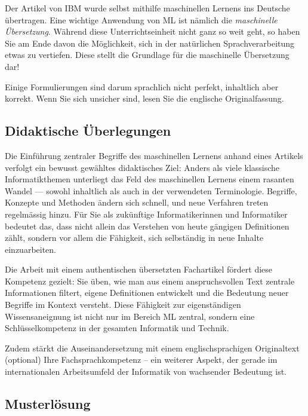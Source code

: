 \begin{lpu}
\begin{hinweis}
    Der Artikel von IBM wurde selbst mithilfe maschinellen Lernens ins Deutsche übertragen. Eine wichtige Anwendung von ML ist nämlich die \textit{maschinelle Übersetzung}. Während diese Unterrichtseinheit nicht ganz so weit geht, so haben Sie am Ende davon die Möglichkeit, sich in der natürlichen Sprachverarbeitung etwas zu vertiefen. Diese stellt die Grundlage für die maschinelle Übersetzung dar! 
    
    Einige Formulierungen sind darum sprachlich nicht perfekt, inhaltlich aber korrekt. Wenn Sie sich unsicher sind, lesen Sie die englische Originalfassung.
\end{hinweis}
\end{lpu}

\subsection*{Didaktische Überlegungen}
Die Einführung zentraler Begriffe des maschinellen Lernens anhand eines Artikels verfolgt ein bewusst gewähltes didaktisches Ziel: Anders als viele klassische Informatikthemen unterliegt das Feld des maschinellen Lernens einem rasanten Wandel — sowohl inhaltlich als auch in der verwendeten Terminologie. Begriffe, Konzepte und Methoden ändern sich schnell, und neue Verfahren treten regelmässig hinzu. Für Sie als zukünftige Informatikerinnen und Informatiker bedeutet das, dass nicht allein das Verstehen von heute gängigen Definitionen zählt, sondern vor allem die Fähigkeit, sich selbständig in neue Inhalte einzuarbeiten.

Die Arbeit mit einem authentischen übersetzten Fachartikel fördert diese Kompetenz gezielt: Sie üben, wie man aus einem anspruchsvollen Text zentrale Informationen filtert, eigene Definitionen entwickelt und die Bedeutung neuer Begriffe im Kontext versteht. Diese Fähigkeit zur eigenständigen Wissensaneignung ist nicht nur im Bereich ML zentral, sondern eine Schlüsselkompetenz in der gesamten Informatik und Technik.

Zudem stärkt die Auseinandersetzung mit einem englischsprachigen Originaltext (optional) Ihre Fachsprachkompetenz – ein weiterer Aspekt, der gerade im internationalen Arbeitsumfeld der Informatik von wachsender Bedeutung ist.

\subsection*{Musterlösung}

